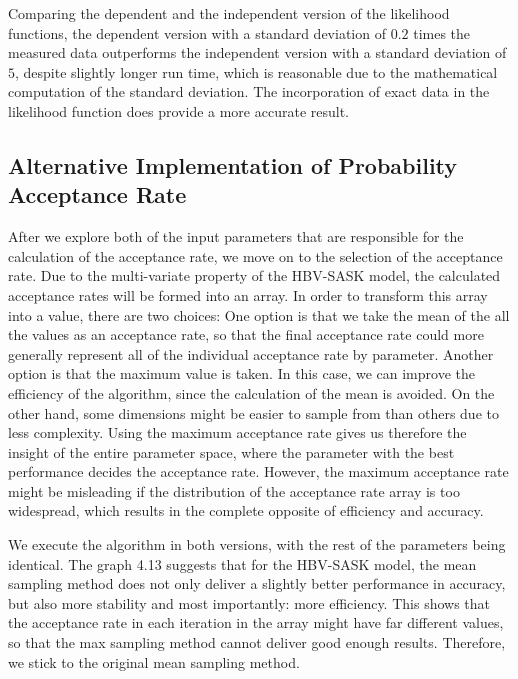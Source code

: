 Comparing the dependent and the independent version of the likelihood functions, the dependent version with a standard deviation of $0.2$ times the measured data outperforms the independent version with a standard deviation of $5$, despite slightly longer run time, which is reasonable due to the mathematical computation of the standard deviation. The incorporation of exact data in the likelihood function does provide a more accurate result.

\subsection{Alternative Implementation of Probability Acceptance Rate}
After we explore both of the input parameters that are responsible for the calculation of the acceptance rate, we move on to the selection of the acceptance rate. Due to the multi-variate property of the HBV-SASK model, the calculated acceptance rates will be formed into an array. In order to transform this array into a value, there are two choices: One option is that we take the mean of the all the values as an acceptance rate, so that the final acceptance rate could more generally represent all of the individual acceptance rate by parameter. Another option is that the maximum value is taken. In this case, we can improve the efficiency of the algorithm, since the calculation of the mean is avoided. On the other hand, some dimensions might be easier to sample from than others due to less complexity. Using the maximum acceptance rate gives us therefore the insight of the entire parameter space, where the parameter with the best performance decides the acceptance rate. However, the maximum acceptance rate might be misleading if the distribution of the acceptance rate array is too widespread, which results in the complete opposite of efficiency and accuracy.

We execute the algorithm in both versions, with the rest of the parameters being identical. The graph 4.13 suggests that for the HBV-SASK model, the mean sampling method does not only deliver a slightly better performance in accuracy, but also more stability and most importantly: more efficiency. This shows that the acceptance rate in each iteration in the array might have far different values, so that the max sampling method cannot deliver good enough results. Therefore, we stick to the original mean sampling method.


